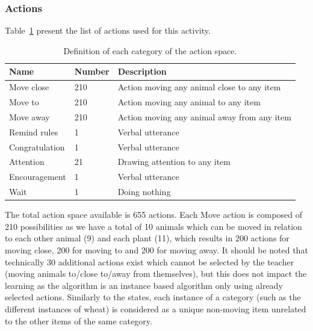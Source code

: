 
\subsubsection{Actions}

Table~\ref{tab:tuto_actions_space} present the list of actions used for this activity.

\begin{table}[ht]
	\centering
	\caption{Definition of each category of the action space.}
	\label{tab:tuto_actions_space}
	\begin{tabularx}{\textwidth}{@{}llX@{}}\toprule
		Name & Number & Description \\
		\midrule
		Move close & 210 &  Action moving any animal close to any item\\
		Move to & 210 & Action moving any animal to any item\\
		Move away & 210 & Action moving any animal away from any item\\
		Remind rules & 1 & Verbal utterance\\
		Congratulation & 1 & Verbal utterance\\
		Attention & 21 & Drawing attention to any item\\
		Encouragement & 1 & Verbal utterance\\
		Wait & 1 & Doing nothing\\
		\bottomrule
	\end{tabularx}
\end{table}

The total action space available is 655 actions. Each Move action is composed of 210 possibilities as we have a total of 10 animals which can be moved in relation to each other animal (9) and each plant (11), which results in 200 actions for moving close, 200 for moving to and 200 for moving away. It should be noted that technically 30 additional actions exist which cannot be selected by the teacher (moving animals to/close to/away from themselves), but this does not impact the learning as the algorithm is an instance based algorithm only using already selected actions. Similarly to the states, each instance of a category (such as the different instances of wheat) is considered as a unique non-moving item unrelated to the other items of the same category.

